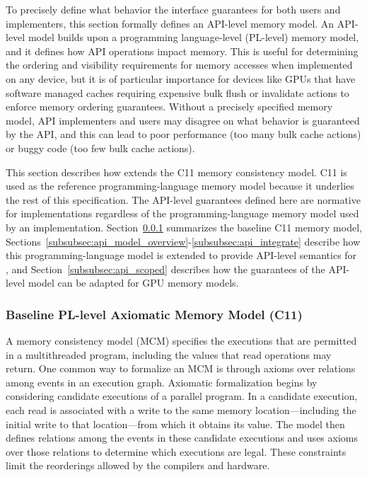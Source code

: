 
To precisely define what behavior the \openshmem interface guarantees for both users and
    implementers, this section formally defines an API-level memory model. An API-level
    model builds upon a programming language-level (PL-level) memory model, and it
    defines how API operations impact memory. This is useful for determining the
    ordering and visibility requirements for \openshmem memory accesses when implemented
    on any device, but it is of particular importance for devices like GPUs that have
    software managed caches requiring expensive bulk flush or invalidate actions to
    enforce memory ordering guarantees. Without a precisely specified memory model, API
    implementers and users may disagree on what behavior is guaranteed by the API, and
    this can lead to poor performance (too many bulk cache actions) or buggy code (too
    few bulk cache actions).

This section describes how \openshmem extends the C11 memory consistency model. C11 is
    used as the reference programming-language memory model because it underlies the
    rest of this specification. The API-level guarantees defined here are normative for
    \openshmem implementations regardless of the programming-language memory model used
    by an implementation. Section~\ref{subsubsec:api_pl_baseline} summarizes the
    baseline C11 memory model,
    Sections~\ref{subsubsec:api_model_overview}-\ref{subsubsec:api_integrate} describe
    how this programming-language model is extended to provide API-level semantics for
    \openshmem, and Section~\ref{subsubsec:api_scoped} describes how the guarantees of
    the API-level model can be adapted for GPU memory models.

\subsubsection{Baseline PL-level Axiomatic Memory Model (C11)}\label{subsubsec:api_pl_baseline}

A memory consistency model (MCM) specifies the executions that are permitted in a
    multithreaded program, including the values that read operations may return. One
    common way to formalize an MCM is through axioms over relations among events in an
    execution graph. Axiomatic formalization begins by considering candidate executions
    of a parallel program. In a candidate execution, each read is associated with a
    write to the same memory location—including the initial write to that location—from
    which it obtains its value. The model then defines relations among the events in
    these candidate executions and uses axioms over those relations to determine which
    executions are legal. These constraints limit the reorderings allowed by the
    compilers and hardware.


